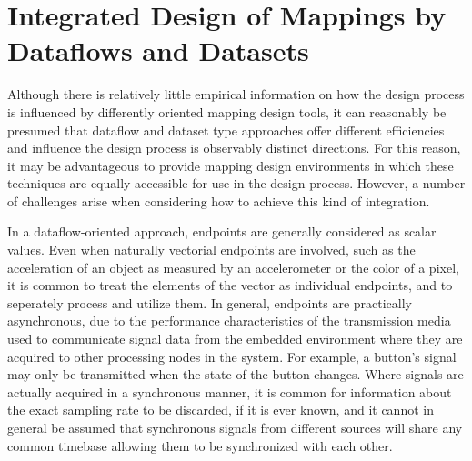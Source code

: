 \documentclass[main.tex]{subfiles}
\begin{document}
\section{Integrated Design of Mappings by Dataflows and Datasets}

Although there is relatively little empirical information on how the design process
is influenced by differently oriented mapping design tools, it can reasonably be
presumed that dataflow and dataset type approaches offer different efficiencies
and influence the design process is observably distinct directions. For this reason,
it may be advantageous to provide mapping design environments in which these
techniques are equally accessible for use in the design process. However, a number of
challenges arise when considering how to achieve this kind of integration.

In a dataflow-oriented approach, endpoints are generally considered as scalar values.
Even when naturally vectorial endpoints are involved, such as the acceleration of an
object as measured by an accelerometer or the color of a pixel, it is common to treat the elements of the
vector as individual endpoints, and to seperately process and utilize them. In general,
endpoints are practically asynchronous, due to the performance characteristics of the
transmission media used to communicate signal data from the embedded environment where
they are acquired to other processing nodes in the system. For example,
a button's signal may only be transmitted when the state of the button changes.
Where signals are actually acquired in a synchronous manner, it is common for information
about the exact sampling rate to be discarded, if it is ever known, and it cannot
in general be assumed that synchronous signals from different sources will share
any common timebase allowing them to be synchronized with each other.
\end{document}

